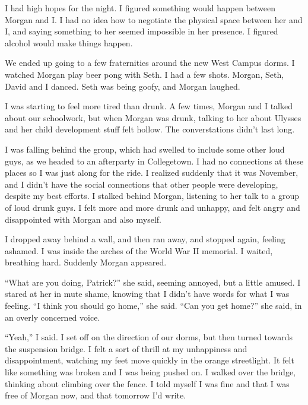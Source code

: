 I had high hopes for the night.  I figured something would happen between Morgan
and I.  I had no idea how to negotiate the physical space between her and I, and
saying something to her seemed impossible in her presence.  I figured alcohol
would make things happen.

We ended up going to a few fraternities around the new West Campus dorms.  I
watched Morgan play beer pong with Seth.  I had a few shots.  Morgan, Seth,
David and I danced.  Seth was being goofy, and Morgan laughed.  

I was starting to feel more tired than drunk.  A few times, Morgan and I talked
about our schoolwork, but when Morgan was drunk, talking to her about Ulysses
and her child development stuff felt hollow.  The converstations didn't last
long.

I was falling behind the group, which had swelled to include some other loud
guys, as we headed to an afterparty in Collegetown.  I had no connections at
these places so I was just along for the ride.  I realized suddenly that it was
November, and I didn't have the social connections that other people were
developing, despite my best efforts.  I stalked behind Morgan, listening to her
talk to a group of loud drunk guys.  I felt more and more drunk and unhappy, and
felt angry and disappointed with Morgan and also myself.

I dropped away behind a wall, and then ran away, and stopped again, feeling
ashamed.   I was inside the arches of the World War II memorial.  I waited,
breathing hard.  Suddenly Morgan appeared.  

``What are you doing, Patrick?'' she said, seeming annoyed, but a little amused.
I stared at her in mute shame, knowing that I didn't have words for what I was
feeling.  ``I think you should go home,'' she said.  ``Can you get home?'' she
said, in an overly concerned voice.

``Yeah,'' I said.  I set off on the direction of our dorms, but then turned
towards the suspension bridge.  I felt a sort of thrill at my unhappiness and
disappointment, watching my feet move quickly in the orange streetlight.  It
felt like something was broken and I was being pushed on.  I walked over the
bridge, thinking about climbing over the fence.  I told myself I was fine and
that I was free of Morgan now, and that tomorrow I'd write.

\section{}

